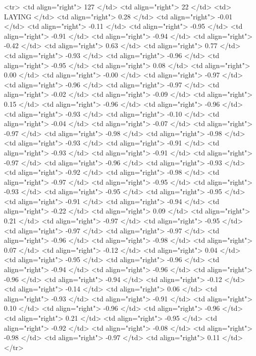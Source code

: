   <tr> <td align="right"> 127 </td> <td align="right">  22 </td> <td> LAYING </td> <td align="right"> 0.28 </td> <td align="right"> -0.01 </td> <td align="right"> -0.11 </td> <td align="right"> -0.95 </td> <td align="right"> -0.91 </td> <td align="right"> -0.94 </td> <td align="right"> -0.42 </td> <td align="right"> 0.63 </td> <td align="right"> 0.77 </td> <td align="right"> -0.93 </td> <td align="right"> -0.96 </td> <td align="right"> -0.95 </td> <td align="right"> 0.08 </td> <td align="right"> 0.00 </td> <td align="right"> -0.00 </td> <td align="right"> -0.97 </td> <td align="right"> -0.96 </td> <td align="right"> -0.97 </td> <td align="right"> -0.02 </td> <td align="right"> -0.09 </td> <td align="right"> 0.15 </td> <td align="right"> -0.96 </td> <td align="right"> -0.96 </td> <td align="right"> -0.93 </td> <td align="right"> -0.10 </td> <td align="right"> -0.04 </td> <td align="right"> -0.07 </td> <td align="right"> -0.97 </td> <td align="right"> -0.98 </td> <td align="right"> -0.98 </td> <td align="right"> -0.93 </td> <td align="right"> -0.91 </td> <td align="right"> -0.93 </td> <td align="right"> -0.91 </td> <td align="right"> -0.97 </td> <td align="right"> -0.96 </td> <td align="right"> -0.93 </td> <td align="right"> -0.92 </td> <td align="right"> -0.98 </td> <td align="right"> -0.97 </td> <td align="right"> -0.95 </td> <td align="right"> -0.93 </td> <td align="right"> -0.95 </td> <td align="right"> -0.95 </td> <td align="right"> -0.91 </td> <td align="right"> -0.94 </td> <td align="right"> -0.22 </td> <td align="right"> 0.09 </td> <td align="right"> 0.21 </td> <td align="right"> -0.97 </td> <td align="right"> -0.95 </td> <td align="right"> -0.97 </td> <td align="right"> -0.97 </td> <td align="right"> -0.96 </td> <td align="right"> -0.98 </td> <td align="right"> 0.07 </td> <td align="right"> -0.12 </td> <td align="right"> 0.04 </td> <td align="right"> -0.95 </td> <td align="right"> -0.96 </td> <td align="right"> -0.94 </td> <td align="right"> -0.96 </td> <td align="right"> -0.96 </td> <td align="right"> -0.94 </td> <td align="right"> -0.12 </td> <td align="right"> -0.14 </td> <td align="right"> 0.06 </td> <td align="right"> -0.93 </td> <td align="right"> -0.91 </td> <td align="right"> 0.10 </td> <td align="right"> -0.96 </td> <td align="right"> -0.96 </td> <td align="right"> 0.21 </td> <td align="right"> -0.95 </td> <td align="right"> -0.92 </td> <td align="right"> -0.08 </td> <td align="right"> -0.98 </td> <td align="right"> -0.97 </td> <td align="right"> 0.11 </td> </tr>
